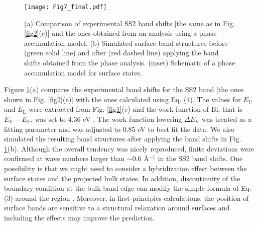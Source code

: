 \documentclass[reprint,secnumarabic,amssymb, nobibnotes, aps, prl,superscriptaddress,showpacs]{revtex4-1}
\begin{document}
\begin{figure}
\texttt{[image: Fig7\_final.pdf]}
\caption{\label{fig7}(a) Comparison of experimental SS2 band shifts [the same as in Fig. \ref{fig2}(e)] and the ones obtained from an analysis using a phase accumulation model. (b) Simulated surface band structures before (green solid line) and after (red dashed line) applying the band shifts obtained from the phase analysis. (inset) Schematic of a phase accumulation model for surface states.} 	
\end{figure}

Figure \ref{fig7}(a) compares the experimental band shifts for the SS2 band [the ones shown in Fig. \ref{fig2}(e)] with the ones calculated using Eq. (4). The values for $E_\mathrm{U}$ and $E_\mathrm{L}$ were extracted from Fig. \ref{fig1}(e) and the work function of Bi, that is $E_\mathrm{V}-E_\mathrm{F}$, was set to 4.36 eV \cite{lide2004}. The work function lowering $\Delta E_\mathrm{V}$ was treated as a fitting parameter and was adjusted to 0.85 eV to best fit the data. We also simulated the resulting band structures after applying the band shifts in Fig. \ref{fig7}(b). Although the overall tendency was nicely reproduced, finite deviations were confirmed at wave numbers larger than $\sim$0.6 \AA$^{-1}$ in the SS2 band shifts. One possibility is that we might need to consider a hybridization effect between the surface states and the projected bulk states. In addition, discontinuity of the boundary condition at the bulk band edge can modify the simple formula of Eq. (3) around the region \cite{matsuda2002}. Moreover, in first-principles calculations, the position of surface bands are sensitive to a structural relaxation around surfaces \cite{koroteev2008} and including the effects may improve the prediction. 



\end{document}
